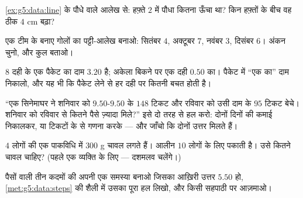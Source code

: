 \begin{exercise}[$\star$]\label{exo:g5:data:6}
\cref{ex:g5:data:line} के पौधे वाले आलेख से: हफ़्ते $2$ में पौधा
कितना ऊँचा था? किन हफ़्तों के बीच वह ठीक $4$ cm
बढ़ा?
\end{exercise}

\begin{exercise}[$\star$]\label{exo:g5:data:7}
एक टीम के बनाए गोलों का पट्टी-आलेख बनाओ:
सितंबर $4$, अक्टूबर $7$, नवंबर $3$, दिसंबर $6$। अंकन चुनो, और
कुल बताओ।
\end{exercise}

\begin{exercise}[$\star$]\label{exo:g5:data:8}
$8$ दही के एक पैकेट का दाम $3.20$ है; अकेला बिकने पर एक दही
$0.50$ का। पैकेट में ``एक का'' दाम निकालो, और यह भी कि पैकेट
लेने से हर दही पर कितनी बचत होती है।
\end{exercise}

\begin{exercise}[$\star\star$]\label{exo:g5:data:9}
``एक सिनेमाघर ने शनिवार को $9.50$-$9.50$ के $148$ टिकट और
रविवार को उसी दाम के $95$ टिकट बेचे। शनिवार को रविवार से कितने
पैसे ज़्यादा मिले?'' इसे दो तरह से हल करो: दोनों दिनों की कमाई
निकालकर, या टिकटों के \emph{} से गणना करके --- और जाँचो कि
दोनों उत्तर मिलते हैं।
\end{exercise}

\begin{exercise}[$\star\star$]\label{exo:g5:data:10}
$4$ लोगों की एक पाकविधि में $300$ g चावल लगते हैं। आलीन $10$
लोगों के लिए पकाती है। उसे कितने चावल चाहिए? (पहले एक व्यक्ति
के लिए --- दशमलव चलेंगे।)
\end{exercise}

\begin{exercise}[$\star\star$]\label{exo:g5:data:11}
पैसों वाली तीन कदमों की अपनी एक समस्या बनाओ जिसका आख़िरी उत्तर
$5.50$ हो, \cref{met:g5:data:steps} की शैली में उसका पूरा हल
लिखो, और किसी सहपाठी पर आज़माओ।
\end{exercise}
